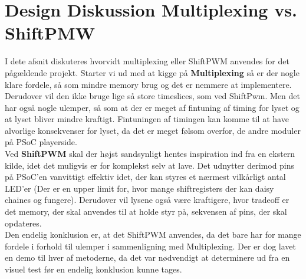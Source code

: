 \documentclass[Softwaredesign/Softwaredesign_main.tex]{subfiles}
\begin{document}
\section{Design Diskussion Multiplexing vs. ShiftPMW}
I dete afsnit diskuteres hvorvidt multiplexing eller ShiftPWM anvendes for det pågældende projekt. Starter vi ud med at kigge på \textbf{Multiplexing} så er der nogle klare fordele, så som mindre memory brug og det er nemmere at implementere. Derudover vil den ikke bruge lige så store timeslices, som ved ShiftPwm. Men det har også nogle ulemper, så som at der er meget af fintuning af timing for lyset og at lyset bliver mindre kraftigt. Fintuningen af timingen kan komme til at have alvorlige konsekvenser for lyset, da det er meget følsom overfor, de andre moduler på PSoC playerside.
\\Ved \textbf{ShiftPWM} skal der højst sandsynligt hentes inspiration ind fra en ekstern kilde, idet det muligvis er for komplekst selv at lave. Det udnytter derimod pins på PSoC'en vanvittigt effektiv idet, der kan styres et nærmest vilkårligt antal LED'er (Der er en upper limit for, hvor mange shiftregisters der kan daisy chaines og fungere). Derudover vil lysene også være kraftigere, hvor tradeoff er det memory, der skal anvendes til at holde styr på, sekvensen af pins, der skal opdateres.
\\Den endelig konklusion er, at det ShiftPWM anvendes, da det bare har for mange fordele i forhold til ulemper i sammenligning med Multiplexing. Der er dog lavet en demo til hver af metoderne, da det var nødvendigt at determinere ud fra en visuel test før en endelig konklusion kunne tages.
\end{document}
